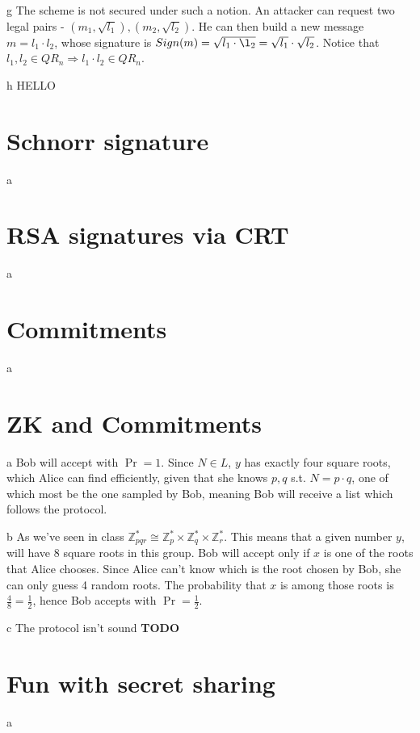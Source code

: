 \documentclass{article}
\begin{document}
\begin{paragraph}
    g The scheme is not secured under such a notion. An attacker can request two legal pairs - 
    $(m_1, \sqrt{l_1}), (m_2, \sqrt{l_2})$. He can then build a new message $m = l_1 \cdot l_2$,
    whose signature is $Sign(m) = \sqrt{l_1 \cdot \l_2} = \sqrt{l_1}\cdot \sqrt{l_2}$. Notice that $l_1, l_2 \in QR_n \Rightarrow l_1 \cdot l_2 \in QR_n$.
\end{paragraph}

\begin{paragraph}
    h HELLO
\end{paragraph}

\section{Schnorr signature}
\quad a 

\section{RSA signatures via CRT}
\quad a 

\section{Commitments}
\quad a

\section{ZK and Commitments}
\begin{paragraph}
    a Bob will accept with $\Pr = 1$. Since $N \in L$, $y$ has exactly four square roots, which
    Alice can find efficiently, given that she knows $p,q$ s.t. $N = p\cdot q$, one
    of which most be the one sampled by Bob, meaning Bob will receive a list which follows
    the protocol.
\end{paragraph}

\begin{paragraph}
    b As we've seen in class $\mathbb{Z}^*_{pqr} \cong \mathbb{Z}^*_p \times \mathbb{Z}^*_q \times \mathbb{Z}^*_r$.
    This means that a given number $y$, will have 8 square roots in this group.
    Bob will accept only if $x$ is one of the roots that Alice chooses. Since Alice can't
    know which is the root chosen by Bob, she can only guess 4 random roots.
    The probability that $x$ is among those roots is $\frac{4}{8} = \frac{1}{2}$, hence
    Bob accepts with $\Pr = \frac{1}{2}$.
\end{paragraph}

\begin{paragraph}
    c The protocol isn't sound {\bf TODO}
\end{paragraph}

\section{Fun with secret sharing}
\quad a
\end{document}
